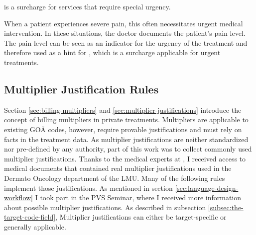  is a surcharge for services that require special urgency.

When a patient experiences severe pain, this often necessitates urgent medical intervention.
In these situations, the doctor documents the patient's pain level.
The pain level can be seen as an indicator for the urgency of the treatment and therefore used as a hint for , which is a surcharge applicable for urgent treatments.



\subsection{Multiplier Justification Rules}\label{subsec:multiplier-justification-rules}
Section \ref{sec:billing-multipliers} and \ref{sec:multiplier-justifications} introduce the concept of billing multipliers in private treatments.
Multipliers are applicable to existing GOÄ codes, however, require provable justifications and must rely on facts in the treatment data.
As multiplier justifications are neither standardized nor pre-defined by any authority,
part of this work was to collect commonly used multiplier justifications.
Thanks to the medical experts at \AV, I received access to medical documents that contained real multiplier justifications used in the Dermato Oncology department of the LMU.
Many of the following rules implement those justifications.
As mentioned in section \ref{sec:language-design-workflow} I took part in the PVS Seminar, where I received more information about possible multiplier justifications.
As described in subsection \ref{subsec:the-target-code-field}, Multiplier justifications can either be target-specific or generally applicable.











